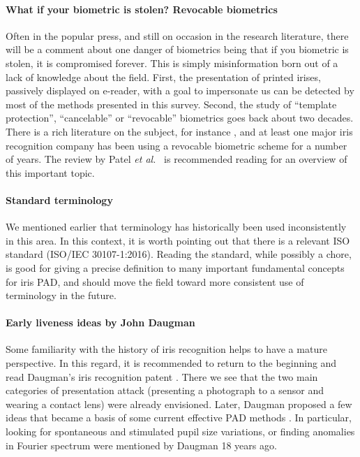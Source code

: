 \documentclass[format=acmsmall, review=false, timestamp=false]{acmart}
\newcommand{\etal}{{\it et al.}~}
\begin{document}
\paragraph{What if your biometric is stolen? Revocable biometrics}

Often in the popular press, and still on occasion in the research literature, there will be a comment about one danger of biometrics being that if you biometric is stolen, it is compromised forever. This is simply misinformation born out of a lack of knowledge about the field. First, the presentation of printed irises, passively displayed on e-reader, with a goal to impersonate us can be detected by most of the methods presented in this survey. Second, the study of ``template protection'', ``cancelable'' or ``revocable'' biometrics goes back about two decades. There is a rich literature on the subject, for instance \cite{Jain_EURASIP_2008,Rathgeb_EURASIP_2011}, and at least one major iris recognition company has been using a revocable biometric scheme for a number of years. The review by Patel \etal \cite{Patel_SPM_2015} is recommended reading for an overview of this important topic.

\paragraph{Standard terminology}

We mentioned earlier that terminology has historically been used inconsistently in this area. In this context, it is worth pointing out that there is a relevant ISO standard (ISO/IEC 30107-1:2016). Reading the standard, while possibly a chore, is good for giving a precise definition to many important fundamental concepts for iris PAD, and should move the field toward more consistent use of terminology in the future.

\paragraph{Early liveness ideas by John Daugman}

Some familiarity with the history of iris recognition helps to have a mature perspective. In this regard, it is recommended to return to the beginning and read Daugman's iris recognition patent \cite{Daugman_patent_1994}. There we see that the two main categories of presentation attack {(presenting a photograph to a sensor and wearing a contact lens)} were already envisioned{.} Later, Daugman proposed a few ideas that became a basis of some current effective PAD methods \cite{Daugman_IMAIP_2000}. In particular, looking for spontaneous and stimulated pupil size variations, or finding anomalies in Fourier spectrum were mentioned by Daugman 18 years ago.
\end{document}
